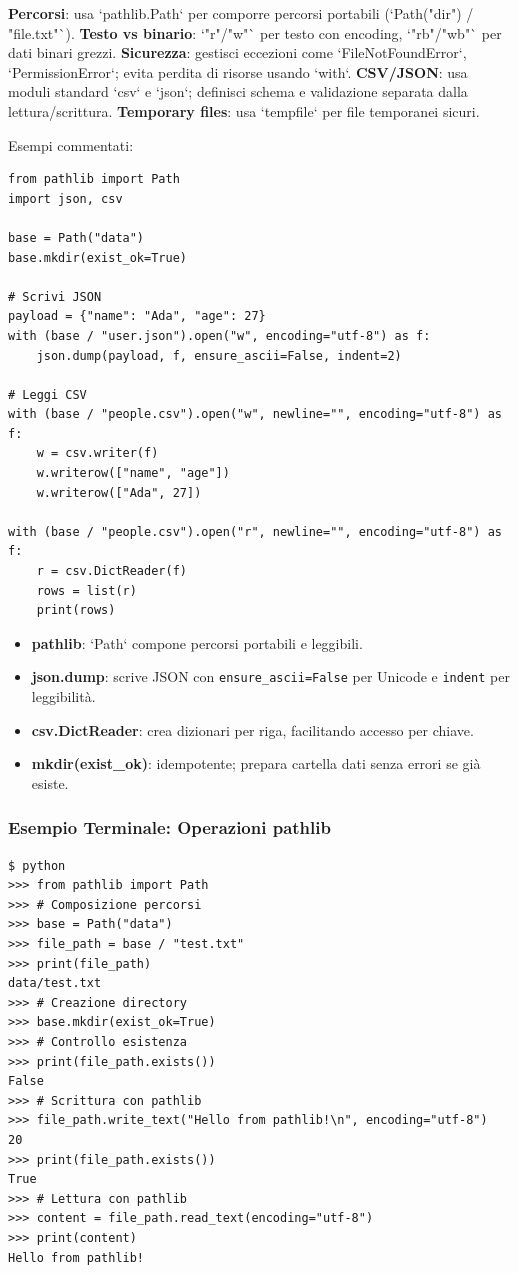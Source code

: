 \begin{tcolorbox}[title=Per chi viene da C/Java/JS: filesystem e flussi]
\textbf{Percorsi}: usa `pathlib.Path` per comporre percorsi portabili (`Path("dir") / "file.txt"`).  
\textbf{Testo vs binario}: `"r"/"w"` per testo con encoding, `"rb"/"wb"` per dati binari grezzi.  
\textbf{Sicurezza}: gestisci eccezioni come `FileNotFoundError`, `PermissionError`; evita perdita di risorse usando `with`.  
\textbf{CSV/JSON}: usa moduli standard `csv` e `json`; definisci schema e validazione separata dalla lettura/scrittura.  
\textbf{Temporary files}: usa `tempfile` per file temporanei sicuri.

Esempi commentati:
\begin{lstlisting}
from pathlib import Path
import json, csv

base = Path("data")
base.mkdir(exist_ok=True)

# Scrivi JSON
payload = {"name": "Ada", "age": 27}
with (base / "user.json").open("w", encoding="utf-8") as f:
    json.dump(payload, f, ensure_ascii=False, indent=2)

# Leggi CSV
with (base / "people.csv").open("w", newline="", encoding="utf-8") as f:
    w = csv.writer(f)
    w.writerow(["name", "age"]) 
    w.writerow(["Ada", 27])

with (base / "people.csv").open("r", newline="", encoding="utf-8") as f:
    r = csv.DictReader(f)
    rows = list(r)
    print(rows)
\end{lstlisting}
\begin{tcolorbox}[title=Spiegazione del codice]
\begin{itemize}
  \item \textbf{pathlib}: `Path` compone percorsi portabili e leggibili.
  \item \textbf{json.dump}: scrive JSON con \verb|ensure_ascii=False| per Unicode e \verb|indent| per leggibilità.
  \item \textbf{csv.DictReader}: crea dizionari per riga, facilitando accesso per chiave.
  \item \textbf{mkdir(exist\_ok)}: idempotente; prepara cartella dati senza errori se già esiste.
\end{itemize}
\end{tcolorbox}

\subsubsection{Esempio Terminale: Operazioni pathlib}
\begin{tcolorbox}[title={\faTerminal\ Output}, colback=black!5, colframe=black!70]
\begin{lstlisting}[style=python]
$ python
>>> from pathlib import Path
>>> # Composizione percorsi
>>> base = Path("data")
>>> file_path = base / "test.txt"
>>> print(file_path)
data/test.txt
>>> # Creazione directory
>>> base.mkdir(exist_ok=True)
>>> # Controllo esistenza
>>> print(file_path.exists())
False
>>> # Scrittura con pathlib
>>> file_path.write_text("Hello from pathlib!\n", encoding="utf-8")
20
>>> print(file_path.exists())
True
>>> # Lettura con pathlib
>>> content = file_path.read_text(encoding="utf-8")
>>> print(content)
Hello from pathlib!


\end{lstlisting}
\end{tcolorbox}
\end{tcolorbox}
